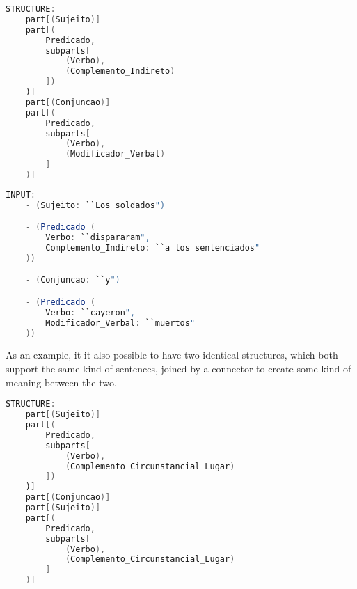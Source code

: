 \begin{center}
\begin{minipage}{10cm}
\begin{lstlisting}[language=java, basicstyle=\tiny, label={lst:example_complex_structure}, caption=Example of a complex sentence structure]
STRUCTURE:
    part[(Sujeito)]
    part[(
        Predicado,
        subparts[
            (Verbo),
            (Complemento_Indireto)
        ])
    )]
    part[(Conjuncao)]
	part[(
        Predicado,
        subparts[
            (Verbo),
            (Modificador_Verbal)
        ]
    )]
\end{lstlisting}
\end{minipage}
\end{center}


\begin{center}
\begin{minipage}{10cm}
\begin{lstlisting}[language=java, basicstyle=\tiny, label={lst:example_complex_input}, caption=Example of a complex sentence input]
INPUT:
    - (Sujeito: ``Los soldados")

    - (Predicado (
        Verbo: ``dispararam",
        Complemento_Indireto: ``a los sentenciados"
    ))

    - (Conjuncao: ``y")

    - (Predicado (
        Verbo: ``cayeron",
        Modificador_Verbal: ``muertos"
    ))
\end{lstlisting}
\end{minipage}
\end{center}

As an example, it it also possible to have two identical structures, which both support the same kind of sentences,
joined by a connector to create some kind of meaning between the two.

\begin{center}
\begin{minipage}{11cm}
\begin{lstlisting}[language=java, basicstyle=\tiny, label={lst:example_complex_structure2}, caption=Example of a complex sentence structure]
STRUCTURE:
    part[(Sujeito)]
    part[(
        Predicado,
        subparts[
            (Verbo),
            (Complemento_Circunstancial_Lugar)
        ])
    )]
    part[(Conjuncao)]
    part[(Sujeito)]
	part[(
        Predicado,
        subparts[
            (Verbo),
            (Complemento_Circunstancial_Lugar)
        ]
    )]
\end{lstlisting}
\end{minipage}
\end{center}


